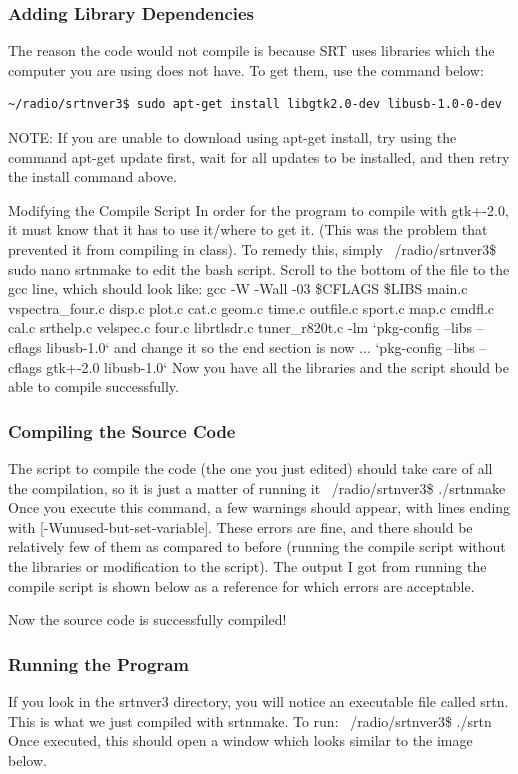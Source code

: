 \documentclass[11pt]{article} %
\begin{document}
\subsubsection{Adding Library Dependencies}
The reason the code would not compile is because SRT uses libraries which the computer you are using does not have. To get them, use the command below:

\begin{verbatim}
~/radio/srtnver3$ sudo apt-get install libgtk2.0-dev libusb-1.0-0-dev
\end{verbatim}


NOTE: If you are unable to download using apt-get install, try using the command apt-get update first, wait for all updates to be installed, and then retry the install command above.

Modifying the Compile Script
In order for the program to compile with gtk+-2.0, it must know that it has to use it/where to get it. (This was the problem that prevented it from compiling in class). To remedy this, simply
~/radio/srtnver3\$ sudo nano srtnmake
to edit the bash script. Scroll to the bottom of the file to the gcc line, which should look like:
gcc -W -Wall -03 \$CFLAGS \$LIBS main.c vspectra\_four.c disp.c plot.c cat.c geom.c time.c outfile.c sport.c map.c cmdfl.c cal.c srthelp.c velspec.c four.c librtlsdr.c tuner\_r820t.c -lm `pkg-config --libs --cflags libusb-1.0`
and change it so the end section is now
... `pkg-config --libs --cflags gtk+-2.0 libusb-1.0`
Now you have all the libraries and the script should be able to compile successfully.

\subsubsection{Compiling the Source Code}
The script to compile the code (the one you just edited) should take care of all the compilation, so it is just a matter of running it
~/radio/srtnver3\$ ./srtnmake
Once you execute this command, a few warnings should appear, with lines ending with [-Wunused-but-set-variable]. These errors are fine, and there should be relatively few of them as compared to before (running the compile script without the libraries or modification to the script). The output I got from running the compile script is shown below as a reference for which errors are acceptable.

Now the source code is successfully compiled!

\subsubsection{Running the Program}
If you look in the srtnver3 directory, you will notice an executable file called srtn. This is what we just compiled with srtnmake. To run:
~/radio/srtnver3\$ ./srtn
Once executed, this should open a window which looks similar to the image below.
\end{document}
